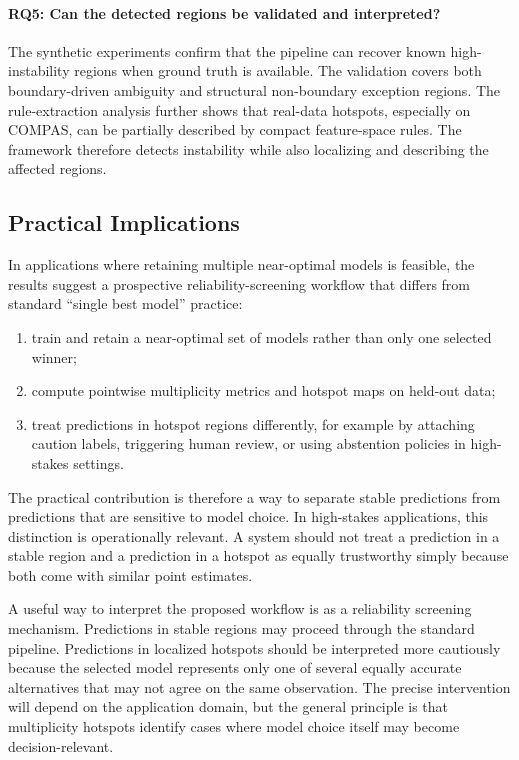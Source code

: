 \paragraph{RQ5: Can the detected regions be validated and interpreted?}
The synthetic experiments confirm that the pipeline can recover known high-instability
regions when ground truth is available. The validation covers both boundary-driven
ambiguity and structural non-boundary exception regions. The rule-extraction analysis
further shows that real-data hotspots, especially on COMPAS, can be partially described
by compact feature-space rules. The framework therefore detects instability while
also localizing and describing the affected regions.


\subsection{Practical Implications}

In applications where retaining multiple near-optimal models is feasible, the results
suggest a prospective reliability-screening workflow that differs from standard
``single best model'' practice:
\begin{enumerate}
    \item train and retain a near-optimal set of models rather than only one selected winner;
    \item compute pointwise multiplicity metrics and hotspot maps on held-out data;
    \item treat predictions in hotspot regions differently, for example by attaching caution
    labels, triggering human review, or using abstention policies in high-stakes settings.
\end{enumerate}

The practical contribution is therefore a way to separate stable predictions from predictions
that are sensitive to model choice. In high-stakes applications, this distinction is operationally
relevant. A system should not treat a prediction in a stable region and a prediction in a hotspot
as equally trustworthy simply because both come with similar point estimates.

A useful way to interpret the proposed workflow is as a reliability screening mechanism. 
Predictions in stable regions may proceed through the standard pipeline. Predictions in 
localized hotspots should be interpreted more cautiously because the selected model represents
only one of several equally accurate alternatives that may not agree on the same observation. 
The precise intervention will depend on the application domain, but the general principle
is that multiplicity hotspots identify cases where model choice itself may become
decision-relevant.

